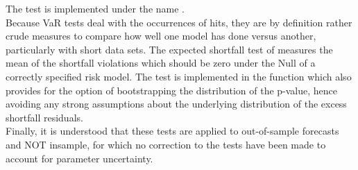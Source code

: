 The test is implemented under the name \verb@VaRDurTest@.\\
Because VaR tests deal with the occurrences of hits, they are by definition
rather crude measures to compare how well one model has done versus another,
particularly with short data sets. The expected shortfall test of \cite{McNeil2000}
measures the mean of the shortfall violations which should be zero under the Null of a
correctly specified risk model. The test is implemented in the function \verb@ESTest@
which also provides for the option of bootstrapping the distribution of the p-value,
hence avoiding any strong assumptions about the underlying distribution of the excess
shortfall residuals.\\
Finally, it is understood that these tests are applied to out-of-sample forecasts
and NOT insample, for which no correction to the tests have been made to account
for parameter uncertainty.

